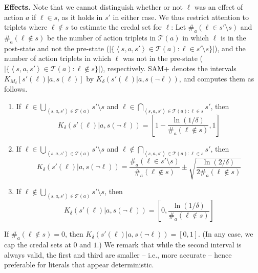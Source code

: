 \documentclass[letterpaper]{article} %
\newcommand{\tuple}[1]{\ensuremath{\left \langle #1 \right \rangle }}
\begin{document}
\noindent \textbf{Effects.} 
Note that we cannot distinguish whether or not $\ell$ was an effect of action $a$ if $\ell\in s$, as it holds in $s'$ in either case. We thus restrict attention to triplets where $\ell\notin s$ to estimate the credal set for $\ell$: 
Let $\#_a(\ell\in s'\setminus s)$ and $\#_a(\ell\notin s)$ 
be the number of action triplets in $\mathcal{T}(a)$ in which $\ell$ is in the post-state and not the pre-state ($|\{\tuple{s, a, s'}\in \mathcal{T}(a):\ell\in s'\setminus s\}|$), 
and the number of action triplets in which $\ell$ was not in the pre-state 
($|\{\tuple{s, a, s'}\in \mathcal{T}(a):\ell\notin s\}|$), respectively. 
SAM+ denotes the intervals $K_{M_\delta}[s'(\ell)|a,s(\ell)]$ 
by $K_\delta(s'(\ell)|a,s(\neg \ell))$, and computes them as follows.
\begin{enumerate}
\item If $\ell \in \bigcup_{\tuple{s, a, s'}\in \mathcal{T}(a)} s'\setminus s$ and $\ell \in \bigcap_{\tuple{s, a, s'}\in \mathcal{T}(a):\ell\in s}s'$, 
then 
\begin{equation}
    K_\delta(s'(\ell)|a,s(\neg \ell)) = \left[1-\frac{\ln(1/\delta)}{\#_a(\ell\notin s)},1\right]
    \label{eq:det-effects}
\end{equation}
    \item If $\ell \in \bigcup_{\tuple{s, a, s'}\in \mathcal{T}(a)} s'\setminus s$ and $\ell \notin \bigcap_{\tuple{s, a, s'}\in \mathcal{T}(a):\ell\in s}s'$, 
then 
\begin{equation}
    K_\delta(s'(\ell)|a,s(\neg \ell)) = \frac{\#_a(\ell\in s'\setminus s)}{\#_a(\ell\notin s)} \pm\sqrt{\frac{\ln(2/\delta)}{2\#_a(\ell\notin s)}}
    \label{eq:present-effects}
\end{equation}
\item If $\ell\notin\bigcup_{\tuple{s, a, s'}\in \mathcal{T}(a)} s'\setminus s$, then 
\begin{equation}
    K_\delta(s'(\ell)|a,s(\neg \ell)) = \left[0,\frac{\ln(1/\delta)}{\#_a(\ell\notin s)}\right]
    \label{eq:missing-effects}
\end{equation}
\end{enumerate}
If $\#_a(\ell\notin s)=0$, then $K_\delta(s'(\ell)|a,s(\neg\ell))=[0,1]$. (In any case, we cap the credal sets at $0$ and $1$.) We remark that while the second interval is always valid, the first and third are smaller -- i.e., more accurate -- hence preferable for literals that appear deterministic.
\end{document}

